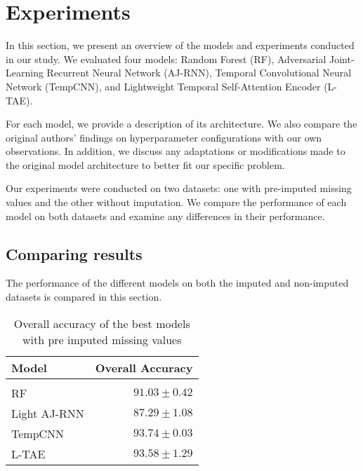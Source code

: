 \chapter{Experiments}
In this section, we present an overview of the models and experiments conducted in our study. We evaluated four models: Random Forest (RF), Adversarial Joint-Learning Recurrent Neural Network (AJ-RNN), Temporal Convolutional Neural Network (TempCNN), and Lightweight Temporal Self-Attention Encoder (L-TAE).

For each model, we provide a description of its architecture.
We also compare the original authors' findings on hyperparameter configurations with our own observations.
In addition, we discuss any adaptations or modifications made to the original model architecture to better fit our specific problem.

Our experiments were conducted on two datasets: one with pre-imputed missing values and the other without imputation. 
We compare the performance of each model on both datasets and examine any differences in their performance.


\pagebreak

\pagebreak

\pagebreak

\pagebreak

\section{Comparing results}

The performance of the different models on both the imputed and non-imputed datasets is compared in this section.

\begin{table}[H]
  \centering
    \begin{tabular}{lr}
    Model                       & Overall Accuracy             \\[0.2cm] 
    \hline \\[-0.2cm]
    RF            & $91.03 \pm 0.42$\\
    Light AJ-RNN  & $87.29 \pm 1.08$\\
    TempCNN       & $93.74 \pm 0.03$\\
    L-TAE         & $93.58 \pm 1.29$
    \end{tabular}
  \caption{Overall accuracy of the best models with pre imputed missing values}
  \label{tab:ALLresultsImputed} 
\end{table}

